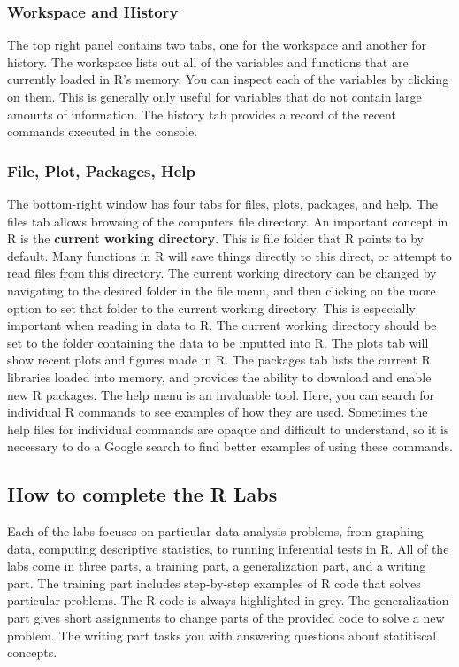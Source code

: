 \documentclass[]{book}
\begin{document}
\subsubsection{Workspace and History}\label{workspace-and-history}

The top right panel contains two tabs, one for the workspace and another
for history. The workspace lists out all of the variables and functions
that are currently loaded in R's memory. You can inspect each of the
variables by clicking on them. This is generally only useful for
variables that do not contain large amounts of information. The history
tab provides a record of the recent commands executed in the console.

\subsubsection{File, Plot, Packages,
Help}\label{file-plot-packages-help}

The bottom-right window has four tabs for files, plots, packages, and
help. The files tab allows browsing of the computers file directory. An
important concept in R is the \textbf{current working directory}. This
is file folder that R points to by default. Many functions in R will
save things directly to this direct, or attempt to read files from this
directory. The current working directory can be changed by navigating to
the desired folder in the file menu, and then clicking on the more
option to set that folder to the current working directory. This is
especially important when reading in data to R. The current working
directory should be set to the folder containing the data to be inputted
into R. The plots tab will show recent plots and figures made in R. The
packages tab lists the current R libraries loaded into memory, and
provides the ability to download and enable new R packages. The help
menu is an invaluable tool. Here, you can search for individual R
commands to see examples of how they are used. Sometimes the help files
for individual commands are opaque and difficult to understand, so it is
necessary to do a Google search to find better examples of using these
commands.

\subsection{How to complete the R
Labs}\label{how-to-complete-the-r-labs}

Each of the labs focuses on particular data-analysis problems, from
graphing data, computing descriptive statistics, to running inferential
tests in R. All of the labs come in three parts, a training part, a
generalization part, and a writing part. The training part includes
step-by-step examples of R code that solves particular problems. The R
code is always highlighted in grey. The generalization part gives short
assignments to change parts of the provided code to solve a new problem.
The writing part tasks you with answering questions about statitiscal
concepts.
\end{document}
